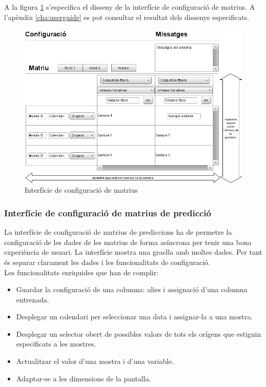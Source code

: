 A la figura \ref{fig:interfacematrixconf} s'especifica el disseny de la interfície de configuraci\'{o} de matrius. A l'apèndix \ref{cha:userguide} es pot consultar el resultat dels dissenys especificats.

\begin{figure}[H]
  \centering
  \includegraphics[scale=0.5]{img/design/Interficiedeconfiguracio.png}
  \caption{Interfície de configuració de matrius}
  \label{fig:interfacematrixconf}
\end{figure}


\subsubsection{Interf\'{i}cie de configuraci\'{o} de matrius de predicció}
La interfície de configuració de matrius de prediccions ha de permetre la configuració de les dades de les matrius de forma asíncrona per tenir una bona experiència de usuari. La interfície mostra una graella amb moltes dades. Per tant \'{e}s separar clarament les dades i les funcionalitats de configuració.\\

Les funcionalitats enriquides que han de complir:
\begin{itemize}
\item Guardar la configuració de una columna: alies i assignació d'una columna entrenada.
\item Desplegar un calendari per seleccionar una data i assignar-la a una mostra.
\item Desplegar un selector obert de possibles valors de tots els orígens que estiguin especificats a les mostres.
\item Actualitzar el valor d'una mostra i d'una variable.
\item Adaptar-se a les dimensions de la pantalla.
\end{itemize}

